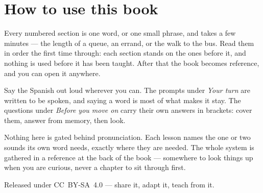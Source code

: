 \documentclass[11pt,twoside]{book}
\begin{document}
\section*{How to use this book}

Every numbered section is one word, or one small phrase, and takes a few
minutes --- the length of a queue, an errand, or the walk to the bus. Read them
in order the first time through: each section stands on the ones before it, and
nothing is used before it has been taught. After that the book becomes
reference, and you can open it anywhere.

Say the Spanish out loud wherever you can. The prompts under \emph{Your turn}
are written to be spoken, and saying a word is most of what makes it stay. The
questions under \emph{Before you move on} carry their own answers in brackets:
cover them, answer from memory, then look.

Nothing here is gated behind pronunciation. Each lesson names the one or two
sounds its own word needs, exactly where they are needed. The whole system is
gathered in a reference at the back of the book --- somewhere to look things up
when you are curious, never a chapter to sit through first.

Released under CC~BY-SA~4.0 --- share it, adapt it, teach from it.

\tableofcontents

\mainmatter


\end{document}
